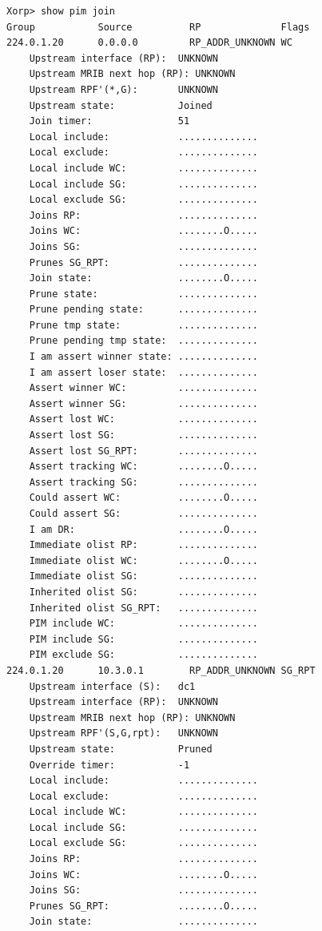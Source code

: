 \documentclass[11pt]{report}
\begin{document}
\begin{itemize}
\begin{verbatim}
Xorp> show pim join 
Group           Source          RP              Flags
224.0.1.20      0.0.0.0         RP_ADDR_UNKNOWN WC   
    Upstream interface (RP):  UNKNOWN
    Upstream MRIB next hop (RP): UNKNOWN
    Upstream RPF'(*,G):       UNKNOWN
    Upstream state:           Joined 
    Join timer:               51
    Local include:            ..............
    Local exclude:            ..............
    Local include WC:         ..............
    Local include SG:         ..............
    Local exclude SG:         ..............
    Joins RP:                 ..............
    Joins WC:                 ........O.....
    Joins SG:                 ..............
    Prunes SG_RPT:            ..............
    Join state:               ........O.....
    Prune state:              ..............
    Prune pending state:      ..............
    Prune tmp state:          ..............
    Prune pending tmp state:  ..............
    I am assert winner state: ..............
    I am assert loser state:  ..............
    Assert winner WC:         ..............
    Assert winner SG:         ..............
    Assert lost WC:           ..............
    Assert lost SG:           ..............
    Assert lost SG_RPT:       ..............
    Assert tracking WC:       ........O.....
    Assert tracking SG:       ..............
    Could assert WC:          ........O.....
    Could assert SG:          ..............
    I am DR:                  ........O.....
    Immediate olist RP:       ..............
    Immediate olist WC:       ........O.....
    Immediate olist SG:       ..............
    Inherited olist SG:       ..............
    Inherited olist SG_RPT:   ..............
    PIM include WC:           ..............
    PIM include SG:           ..............
    PIM exclude SG:           ..............
224.0.1.20      10.3.0.1        RP_ADDR_UNKNOWN SG_RPT 
    Upstream interface (S):   dc1
    Upstream interface (RP):  UNKNOWN
    Upstream MRIB next hop (RP): UNKNOWN
    Upstream RPF'(S,G,rpt):   UNKNOWN
    Upstream state:           Pruned 
    Override timer:           -1
    Local include:            ..............
    Local exclude:            ..............
    Local include WC:         ..............
    Local include SG:         ..............
    Local exclude SG:         ..............
    Joins RP:                 ..............
    Joins WC:                 ........O.....
    Joins SG:                 ..............
    Prunes SG_RPT:            ........O.....
    Join state:               ..............

\end{verbatim}
\end{itemize}
\end{document}
